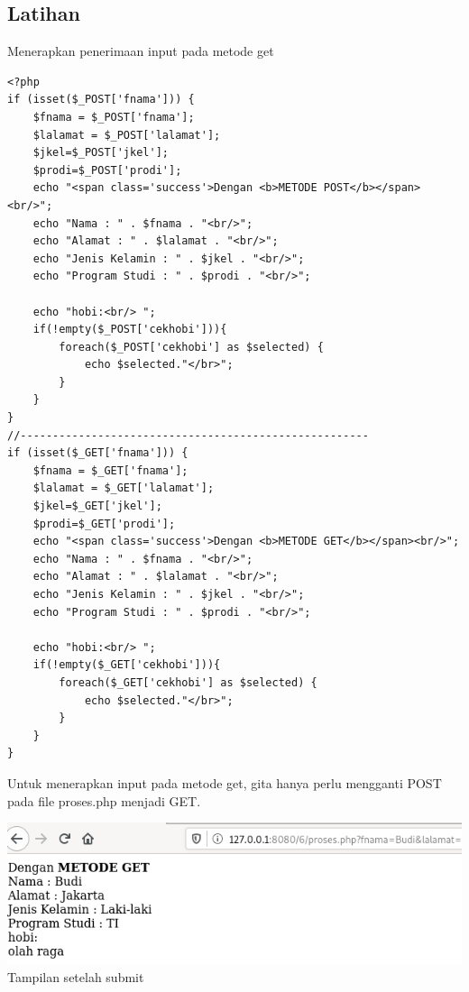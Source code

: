 \documentclass[a4paper,12pt]{article}
\begin{document}
\subsection{Latihan}
Menerapkan penerimaan input pada metode get
\begin{lstlisting}[style=PHP]
<?php
if (isset($_POST['fnama'])) {
    $fnama = $_POST['fnama'];
    $lalamat = $_POST['lalamat'];
    $jkel=$_POST['jkel'];
    $prodi=$_POST['prodi'];
    echo "<span class='success'>Dengan <b>METODE POST</b></span><br/>";
    echo "Nama : " . $fnama . "<br/>";
    echo "Alamat : " . $lalamat . "<br/>";
    echo "Jenis Kelamin : " . $jkel . "<br/>";
    echo "Program Studi : " . $prodi . "<br/>";

    echo "hobi:<br/> ";
    if(!empty($_POST['cekhobi'])){
        foreach($_POST['cekhobi'] as $selected) {
            echo $selected."</br>";
        }
    }
}
//------------------------------------------------------
if (isset($_GET['fnama'])) {
    $fnama = $_GET['fnama'];
    $lalamat = $_GET['lalamat'];
    $jkel=$_GET['jkel'];
    $prodi=$_GET['prodi'];
    echo "<span class='success'>Dengan <b>METODE GET</b></span><br/>";
    echo "Nama : " . $fnama . "<br/>";
    echo "Alamat : " . $lalamat . "<br/>";
    echo "Jenis Kelamin : " . $jkel . "<br/>";
    echo "Program Studi : " . $prodi . "<br/>";

    echo "hobi:<br/> ";
    if(!empty($_GET['cekhobi'])){
        foreach($_GET['cekhobi'] as $selected) {
            echo $selected."</br>";
        }
    }
}
\end{lstlisting}
Untuk menerapkan input pada metode get, gita hanya perlu mengganti POST pada file proses.php menjadi GET.\\
\begin{minipage}{\linewidth}
    \centering
    \includegraphics[scale=.6]{get.png}\\
    \caption{Tampilan setelah submit}
\end{minipage}

\newpage
\end{document}
